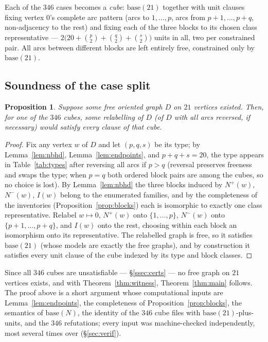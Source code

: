 \documentclass[11pt]{amsart}
\newcommand{\Np}{N^{+}}
\newcommand{\Nm}{N^{-}}
\newcommand{\NI}{I}
\theoremstyle{plain}
\newtheorem{proposition}[theorem]{Proposition}
\theoremstyle{definition}
\theoremstyle{remark}
\begin{document}
Each of the $346$ cases becomes a \emph{cube}: $\mathrm{base}(21)$
together with unit clauses fixing vertex $0$'s complete arc pattern
(arcs to $1,\dots,p$, arcs from $p+1,\dots,p+q$, non-adjacency to the
rest) and fixing each of the three blocks to its chosen class
representative --- $2\bigl(20+\binom{p}{2}+\binom{q}{2}+\binom{s}{2}\bigr)$
units in all, two per constrained pair. All arcs between different
blocks are left entirely free, constrained only by
$\mathrm{base}(21)$.

\subsection{Soundness of the case split}\label{ssec:canon}

\begin{proposition}\label{prop:canon}
Suppose some free oriented graph $D$ on $21$ vertices existed. Then, for
one of the $346$ cubes, some relabelling of $D$ (of $D$ with all arcs
reversed, if necessary) would satisfy every clause of that cube.
\end{proposition}

\begin{proof}
Fix any vertex $w$ of $D$ and let $(p,q,s)$ be its type; by
Lemma~\ref{lem:nbhd}, Lemma~\ref{lem:endpoints}, and $p+q+s=20$, the
type appears in Table~\ref{tab:types} after reversing all arcs if
$p>q$ (reversal preserves freeness and swaps the type; when $p=q$ both
ordered block pairs are among the cubes, so no choice is lost). By
Lemma~\ref{lem:nbhd} the three blocks induced by $\Np(w)$, $\Nm(w)$,
$\NI(w)$ belong to the enumerated families, and by the completeness of
the inventories (Proposition~\ref{prop:blocks}) each is isomorphic to
exactly one class representative. Relabel $w\mapsto 0$, $\Np(w)$ onto
$\{1,\dots,p\}$, $\Nm(w)$ onto $\{p+1,\dots,p+q\}$, and $\NI(w)$ onto
the rest, choosing within each block an isomorphism onto its
representative. The relabelled graph is free, so it satisfies
$\mathrm{base}(21)$ (whose models are exactly the free graphs), and by
construction it satisfies every unit clause of the cube indexed by its
type and block classes.
\end{proof}

Since all $346$ cubes are unsatisfiable --- \S\ref{ssec:certs} --- no
free graph on $21$ vertices exists, and with Theorem~\ref{thm:witness},
Theorem~\ref{thm:main} follows. The proof above is a short argument
whose computational inputs are Lemma~\ref{lem:endpoints}, the
completeness of Proposition~\ref{prop:blocks}, the semantics of
$\mathrm{base}(N)$, the identity of the $346$ cube files with
$\mathrm{base}(21)$-plus-units, and the $346$ refutations; every input
was machine-checked independently, most several times over
(\S\ref{sec:verif}).
\end{document}
